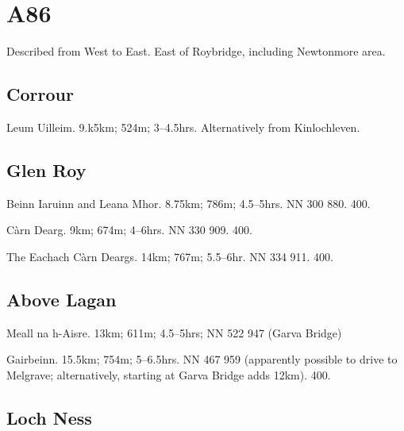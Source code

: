 \section{A86}

Described from West to East.  East of Roybridge, including Newtonmore area.

\subsection{Corrour}

\begin{munros}
\item
Leum Uilleim.  9.k5km; 524m; 3--4.5hrs.  Alternatively from Kinlochleven.  
\end{munros}


\subsection{Glen Roy}

\begin{munros}
\item
Beinn Iaruinn and Leana Mhor.  8.75km; 786m; 4.5--5hrs.  NN 300 880.  400.

\item
Càrn Dearg.  9km; 674m; 4--6hrs.   NN 330 909.  400.

\item
The Eachach Càrn Deargs.  14km; 767m; 5.5--6hr.  NN 334 911.  400.
\end{munros}


\subsection{Above Lagan}

\begin{munros}
\item
Meall na h-Aisre.  13km; 611m; 4.5--5hrs; NN 522 947 (Garva Bridge)

\item
Gairbeinn.  15.5km; 754m; 5--6.5hrs.  NN 467 959 (apparently possible to drive
to Melgrave; alternatively, starting at Garva Bridge adds 12km).  400.
\end{munros}


\subsection{Loch Ness}

